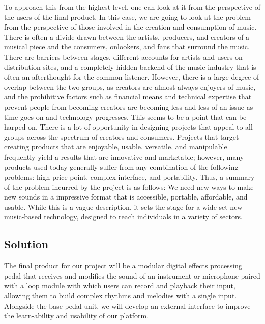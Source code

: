 \documentclass[onecolumn, draftclsnofoot,10pt, compsoc]{IEEEtran}
\begin{document}
	To approach this from the highest level, one can look at it from the perspective of the users of the final product.
	In this case, we are going to look at the problem from the perspective of those involved in the creation and consumption of music.
	There is often a divide drawn between the artists, producers, and creators of a musical piece and the consumers, onlookers, and fans that surround the music.
	There are barriers between stages, different accounts for artists and users on distribution sites, and a completely hidden backend of the music industry that is often an afterthought for the common listener.
	However, there is a large degree of overlap between the two groups, as creators are almost always enjoyers of music, and the prohibitive factors such as financial means and technical expertise that prevent people from becoming creators are becoming less and less of an issue as time goes on and technology progresses.
	This seems to be a point that can be harped on.
	There is a lot of opportunity in designing projects that appeal to all groups across the spectrum of creators and consumers.
	Projects that target creating products that are enjoyable, usable, versatile, and manipulable frequently yield a results that are innovative and marketable; however, many products used today generally suffer from any combination of the following problems: high price point, complex interface, and portability.
	Thus, a summary of the problem incurred by the project is as follows: We need new ways to make new sounds in a impressive format that is accessible, portable, affordable, and usable.
	While this is a vague description, it sets the stage for a wide set new music-based technology, designed to reach individuals in a variety of sectors.
\subsection{Solution}
The final product for our project will be a modular 
digital effects processing pedal that receives and modifies the sound of an instrument or microphone paired with a loop module with which users can record and playback their input, allowing them to build complex rhythms and melodies with a single input. Alongside the base pedal unit, we will develop an external interface to improve the learn-ability and usability of our platform.
\end{document}
